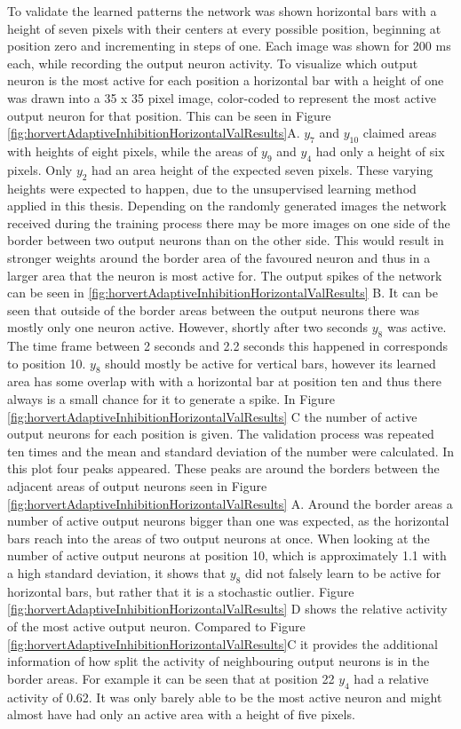 To validate the learned patterns the network was shown horizontal bars with a height of seven pixels with their centers at every possible position, beginning at position zero and incrementing in steps of one. Each image was shown for 200 ms each, while recording the output neuron activity. To visualize which output neuron is the most active for each position a horizontal bar with a height of one was drawn into a 35 x 35 pixel image, color-coded to represent the most active output neuron for that position. This can be seen in Figure \ref{fig:horvertAdaptiveInhibitionHorizontalValResults}A. $y_7$ and $y_{10}$ claimed areas with heights of eight pixels, while the areas of $y_9$ and $y_4$ had only a height of six pixels. Only $y_2$ had an area height of the expected seven pixels. These varying heights were expected to happen, due to the unsupervised learning method applied in this thesis. Depending on the randomly generated images the network received during the training process there may be more images on one side of the border between two output neurons than on the other side. This would result in stronger weights around the border area of the favoured neuron and thus in a larger area that the neuron is most active for.
The output spikes of the network can be seen in \ref{fig:horvertAdaptiveInhibitionHorizontalValResults} B. It can be seen that outside of the border areas between the output neurons there was mostly only one neuron active. However, shortly after two seconds $y_8$ was active. The time frame between 2 seconds and 2.2 seconds this happened in corresponds to position 10. $y_8$ should mostly be active for vertical bars, however its learned area has some overlap with with a horizontal bar at position ten and thus there always is a small chance for it to generate a spike. 
In Figure \ref{fig:horvertAdaptiveInhibitionHorizontalValResults} C the number of active output neurons for each position is given.  The validation process was repeated ten times and the mean and standard deviation of the number were calculated. In this plot four peaks appeared. These peaks are around the borders between the adjacent areas of output neurons seen in Figure \ref{fig:horvertAdaptiveInhibitionHorizontalValResults} A. Around the border areas a number of active output neurons bigger than one was expected, as the horizontal bars reach into the areas of two output neurons at once. When looking at the number of active output neurons at position 10, which is approximately 1.1 with a high standard deviation, it shows that $y_8$ did not falsely learn to be active for horizontal bars, but rather that it is a stochastic outlier. Figure \ref{fig:horvertAdaptiveInhibitionHorizontalValResults} D shows the relative activity of the most active output neuron. Compared to Figure \ref{fig:horvertAdaptiveInhibitionHorizontalValResults}C it provides the additional information of how split the activity of neighbouring output neurons is in the border areas. For example it can be seen that at position 22 $y_4$ had a relative activity of 0.62. It was only barely able to be the most active neuron and might almost have had only an active area with a height of five pixels.

